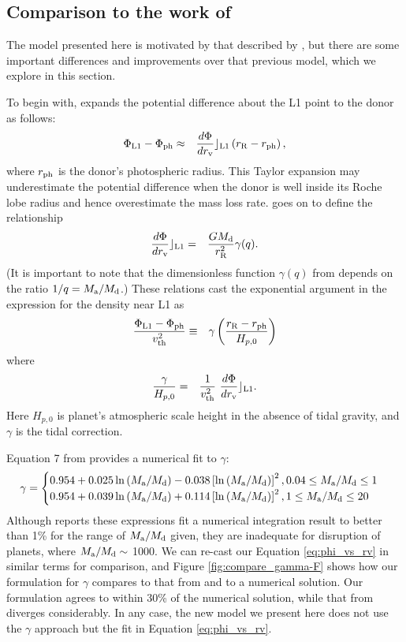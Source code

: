 \documentclass{aastex}
\newcommand{\be}{\begin{eqnarray}}
\newcommand{\ee}{\end{eqnarray}}
\newcommand{\rv}{r_{\rm v}}
\begin{document}
\subsection{Comparison to the work of \citet{1988A&A...202...93R}}
The model presented here is motivated by that described by \citet{1988A&A...202...93R}, but there are some important differences and improvements over that previous model, which we explore in this section.

To begin with, \citet{1988A&A...202...93R} expands the potential difference about the L1 point to the donor as follows:
\be
\Phi_{\rm L1}-\Phi_{\rm ph} & \approx & \frac{d\Phi}{d\rv} \rfloor_{\rm L1}  \left( r_{\rm R} - r_{\rm ph} \right),
\ee
where $r_{\rm ph}$ is the donor's photospheric radius. This Taylor expansion may underestimate the potential difference when the donor is well inside its Roche lobe radius and hence overestimate the mass loss rate. \citet{1988A&A...202...93R} goes on to define the relationship
\be
\frac{d\Phi}{d\rv} \rfloor_{\rm L1} & =& \frac{GM_{\rm d}}{r_{\rm R}^2} \gamma(q).
\ee
(It is important to note that the dimensionless function $\gamma(q)$ from \citet{1988A&A...202...93R} depends on the ratio $1/q = M_{\rm a}/M_{\rm d}$.) 
These relations cast the exponential argument in the expression for the density near L1 as
\be
\frac{ \Phi_{\rm L1}-\Phi_{\rm ph}}{v_{\rm th}^2} & \equiv & \gamma  \left( \frac{ r_{\rm R} - r_{\rm ph} }{ H_{p,0} } \right)
\ee
where 
\be
\frac{\gamma}{H_{p,0}} &  = & \frac{1}{v_{\rm th}^2} \  \frac{d\Phi}{d\rv} \rfloor_{\rm L1}.
\label{eqn:modified_scale_height}
\ee
Here $H_{p,0}$ is planet's atmospheric scale height in the absence of tidal gravity, and $\gamma$ is the tidal correction.

Equation 7 from \citet{1988A&A...202...93R} provides a numerical fit to $\gamma$:
\begin{align}
\gamma = 
\begin{cases} 
0.954 + 0.025 \ln \left( M_{\rm a}/M_{\rm d}\right) - 0.038 \left[ \ln \left( M_{\rm a}/M_{\rm d} \right) \right]^2, {\rm 0.04} \le M_{\rm a}/M_{\rm d} \le {\rm 1}\\
 0.954 + 0.039 \ln \left( M_{\rm a}/M_{\rm d} \right) + 0.114 \left[ \ln \left( M_{\rm a}/M_{\rm d} \right) \right]^2, {\rm 1} \le M_{\rm a}/M_{\rm d} \le {\rm 20}
\end{cases}
\label{eq:ritter_gamma}
\end{align}
Although \citet{1988A&A...202...93R} reports these expressions fit a numerical integration result to better than 1\% for the range of $M_{\rm a}/M_{\rm d}$ given, they are inadequate for disruption of planets, where $M_{\rm a}/M_{\rm d} \sim $ 1000. We can re-cast our Equation \ref{eq:phi_vs_rv} in similar terms for comparison, and Figure \ref{fig:compare_gamma-F} shows how our formulation for $\gamma$ compares to that from \citet{1988A&A...202...93R} and to a numerical solution. Our formulation agrees to within 30\% of the numerical solution, while that from \citet{1988A&A...202...93R} diverges considerably. In any case, the new model we present here does not use the $\gamma$ approach but the fit in Equation \ref{eq:phi_vs_rv}.
\end{document}
